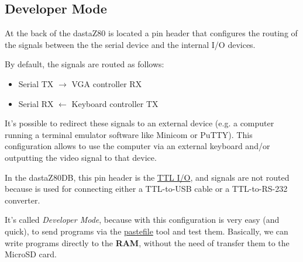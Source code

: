 

    \subsection{Developer Mode}
    \label{subsec:devmode}

    At the back of the dastaZ80 is located a pin header that configures the
    routing of the signals between the the serial device and the internal I/O
    devices.

    By default, the signals are routed as follows:

    \begin{itemize}
        \item Serial TX $\rightarrow$ VGA controller RX
        \item Serial RX $\leftarrow$ Keyboard controller TX
    \end{itemize}

    It's possible to redirect these signals to an external device (e.g. a
    computer running a terminal emulator software like Minicom or PuTTY). This
    configuration allows to use the computer via an external keyboard and/or
    outputting the video signal to that device.

    In the dastaZ80DB, this pin header is the \hyperref[subsubsection:ttlio]
    {TTL I/O}, and signals are not routed because is used for connecting either
    a TTL-to-USB cable or a TTL-to-RS-232 converter.

    It's called \textit{Developer Mode}, because with this configuration is very
    easy (and quick), to send programs via the \hyperref[software:pastefile]
    {pastefile} tool and test them. Basically, we can write programs directly to
    the \textbf{RAM}, without the need of transfer them to the MicroSD card.